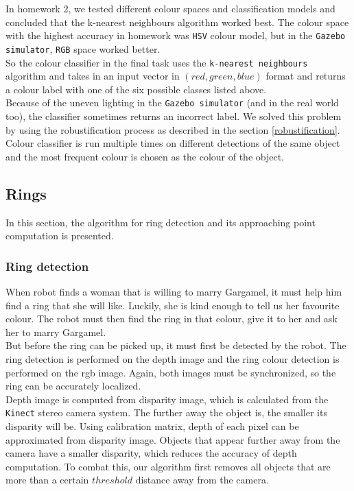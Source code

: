 \documentclass[12pt,a4paper]{article}
\begin{document}
	In homework 2, we tested different colour spaces and classification models and concluded that the k-nearest neighbours algorithm worked best. The colour space with the highest accuracy in homework was \texttt{HSV} colour model, but in the \texttt{Gazebo simulator}, \texttt{RGB} space worked better. \\
	
	So the colour classifier in the final task uses the \texttt{k-nearest neighbours} algorithm and takes in an input vector in $(red, green, blue)$ format and returns a colour label with one of the six possible classes listed above. \\
	
	Because of the uneven lighting in the \texttt{Gazebo simulator} (and in the real world too), the classifier sometimes returns an incorrect label. We solved this problem by using the robustification process as described in the section \ref{robustification}. Colour classifier is run multiple times on different detections of the same object and the most frequent colour is chosen as the colour of the object. \\
	
	\subsection{Rings}
	In this section, the algorithm for ring detection and its approaching point computation is presented.
	
	\subsubsection{Ring detection} \label{ring_detection}
	When robot finds a woman that is willing to marry Gargamel, it must help him find a ring that she will like. Luckily, she is kind enough to tell us her favourite colour. The robot must then find the ring in that colour, give it to her and ask her to marry Gargamel. \\
	
	But before the ring can be picked up, it must first be detected by the robot. The ring detection is performed on the depth image and the ring colour detection is performed on the rgb image. Again, both images must be synchronized, so the ring can be accurately localized. \\
	
	Depth image is computed from disparity image, which is calculated from the \texttt{Kinect} stereo camera system. The further away the object is, the smaller its disparity will be. Using calibration matrix, depth of each pixel can be approximated from disparity image. Objects that appear further away from the camera have a smaller disparity, which reduces the accuracy of depth computation. To combat this, our algorithm first removes all objects that are more than a certain $threshold$ distance away from the camera. \\
	
\end{document}
